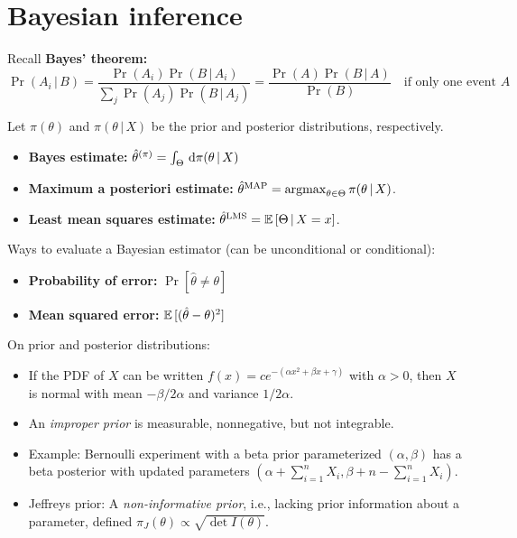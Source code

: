 \documentclass[a4paper]{article}
\begin{document}
\section{Bayesian inference}
    Recall \textbf{Bayes' theorem:}
    \[
        \Pr{(A_i \,|\, B)}
            = \frac{\Pr{(A_i)} \Pr{(B \,|\, A_i)}}{\sum_j \Pr{(A_j) \Pr{(B \,|\, A_j)}}}
            = \frac{\Pr{(A)} \Pr{(B \,|\, A)}}{\Pr{(B)}} \quad \text{if only one event } A
    \]

    Let $\pi(\theta)$ and $\pi(\theta \,|\, X)$ be the prior and posterior distributions, respectively.
    \begin{itemize}
        \item \textbf{Bayes estimate:} $\hat{\theta}^{(\pi)} = \int_\Theta \difl \pi(\theta \,|\, X)$
        \item \textbf{Maximum a posteriori estimate:} $\hat{\theta}^{\textrm{MAP}} = \operatorname*{argmax}_{\theta \in \Theta} \pi(\theta \,|\, X)$.
        \item \textbf{Least mean squares estimate:} $\hat{\theta}^{\textrm{LMS}} = \operatorname{\mathbb{E}}{[\Theta \,|\, X = x]}$.
    \end{itemize}
    Ways to evaluate a Bayesian estimator (can be unconditional or conditional):
    \begin{itemize}
        \item \textbf{Probability of error:} $\Pr{[\hat{\theta} \neq \theta]}$
        \item \textbf{Mean squared error:} $\operatorname{\mathbb{E}}{[(\hat{\theta} - \theta)^2]}$
    \end{itemize}

    On prior and posterior distributions:
    \begin{itemize}
        \item If the PDF of $X$ can be written $f(x) = c e^{-(\alpha x^2 + \beta x + \gamma)}$ with $\alpha > 0$, then $X$ is normal with mean $-\beta / 2\alpha$ and variance $1 / 2\alpha$.
        \item An \emph{improper prior} is measurable, nonnegative, but not integrable.
        \item Example: Bernoulli experiment with a beta prior parameterized $(\alpha, \beta)$ has a beta posterior with updated parameters $\left(\alpha + \sum_{i=1}^{n} X_i, \beta + n - \sum_{i=1}^{n} X_i\right)$.
        \item Jeffreys prior: A \emph{non-informative prior}, i.e., lacking prior information about a parameter, defined $\pi_J(\theta) \propto \sqrt{\det{I(\theta)}}$.
    \end{itemize}
\end{document}
